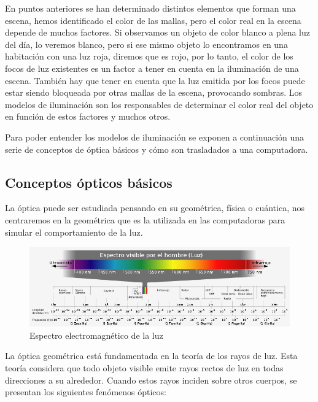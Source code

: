 En puntos anteriores se han determinado distintos elementos que forman una escena, hemos identificado el color de las mallas, pero el color real en la escena depende de muchos factores. Si observamos un objeto de color blanco a plena luz del día, lo veremos blanco, pero si ese mismo objeto lo encontramos en una habitación con una luz roja, diremos que es rojo, por lo tanto, el color de los focos de luz existentes es un factor a tener en cuenta en la iluminación de una escena. También hay que tener en cuenta que la luz emitida por los focos puede estar siendo bloqueada por otras mallas de la escena, provocando sombras. Los modelos de iluminación son los responsables de determinar el color real del objeto en función de estos factores y muchos otros.
\newline

Para poder entender los modelos de iluminación se exponen a continuación una serie de conceptos de óptica básicos y cómo son trasladados a una computadora.

\subsection{Conceptos ópticos básicos}

La óptica puede ser estudiada pensando en su geométrica, física o cuántica, nos centraremos en la geométrica que es la utilizada en las computadoras para simular el comportamiento de la luz.
\newline

\begin{figure}[h]
	\centering
	          \includegraphics[width=14cm]{img/espectroElectromagnetico.png}
	\caption{Espectro electromagnético de la luz}
\end{figure}

La óptica geométrica está fundamentada en la teoría de los rayos de luz. Esta teoría considera que todo objeto visible emite rayos rectos de luz en todas direcciones a su alrededor. Cuando estos rayos inciden sobre otros cuerpos, se presentan los siguientes fenómenos ópticos:

